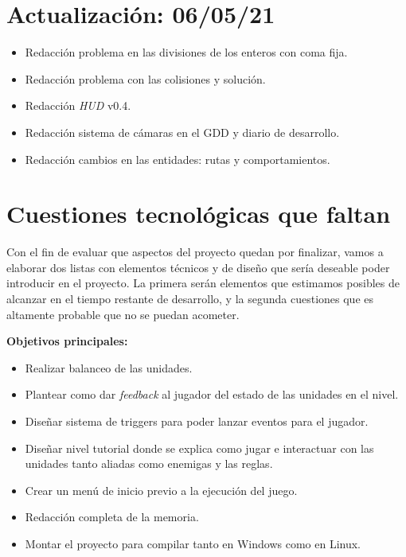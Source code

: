 \section{Actualización: 06/05/21}
\begin{itemize}
	\item Redacción problema en las divisiones de los enteros con coma fija.

	\item Redacción problema con las colisiones y solución.

	\item Redacción \textit{HUD} v0.4.
	
	\item Redacción sistema de cámaras en el GDD y diario de desarrollo.

	\item Redacción cambios en las entidades: rutas y comportamientos.
\end{itemize}

\section{Cuestiones tecnológicas que faltan}
Con el fin de evaluar que aspectos del proyecto quedan por finalizar, vamos a elaborar dos listas con
elementos técnicos y de diseño que sería deseable poder introducir en el proyecto. La primera serán
elementos que estimamos posibles de alcanzar en el tiempo restante de desarrollo, y la segunda
cuestiones que es altamente probable que no se puedan acometer.

\textbf{Objetivos principales:}
\begin{itemize}
	\item Realizar balanceo de las unidades.

	\item Plantear como dar \textit{feedback} al jugador del estado de las unidades en el nivel.

	\item Diseñar sistema de triggers para poder lanzar eventos para el jugador.

	\item Diseñar nivel tutorial donde se explica como jugar e interactuar con las unidades
	tanto aliadas como enemigas y las reglas.

	\item Crear un menú de inicio previo a la ejecución del juego.

	\item Redacción completa de la memoria.

	\item Montar el proyecto para compilar tanto en Windows como en Linux.
\end{itemize}

